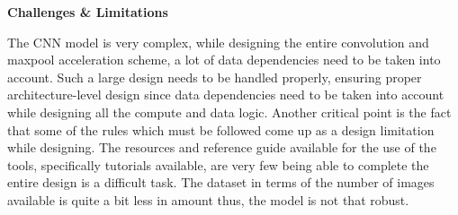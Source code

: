     \noindent
    \textbf{Challenges \& Limitations}
    \par \noindent
    The CNN model is very complex, while designing the entire convolution and maxpool acceleration scheme, a lot of data dependencies need to be taken into account. Such a large design needs to be handled properly, ensuring proper architecture-level design since data dependencies need to be taken into account while designing all the compute and data logic. Another critical point is the fact that some of the rules which must be followed come up as a design limitation while designing. The resources and reference guide available for the use of the tools, specifically tutorials available, are very few being able to complete the entire design is a difficult task. The dataset in terms of the number of images available is quite a bit less in amount thus, the model is not that robust.

    

    


    

    

    
     



